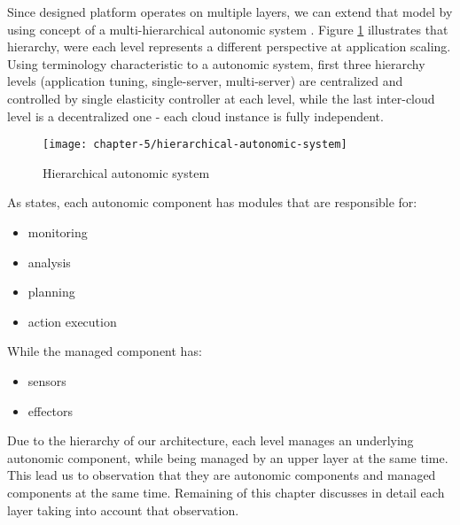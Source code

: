 Since designed platform operates on multiple layers, we can extend that model by using concept of a multi-hierarchical autonomic system \cite{LiWoZh05}. Figure \ref{ch5:hierarchical-autonomic-system} illustrates that hierarchy, were each level represents a different perspective at application scaling. Using terminology characteristic to a autonomic system, first three hierarchy levels (application tuning, single-server, multi-server) are centralized and controlled by single elasticity controller at each level, while the last inter-cloud level is a decentralized one - each cloud instance is fully independent.

\begin{figure}[!ht]
  \begin{center}
    \texttt{[image: chapter-5/hierarchical-autonomic-system]}
  \end{center}
  \caption{Hierarchical autonomic system}
  \label{ch5:hierarchical-autonomic-system}
\end{figure}

As \cite{IBM06} states, each autonomic component has modules that are responsible for:
\begin{itemize}
	\item monitoring
	\item analysis
	\item planning
	\item action execution
\end{itemize}

While the managed component has:
\begin{itemize}
	\item sensors
	\item effectors
\end{itemize}

Due to the hierarchy of our architecture, each level manages an underlying autonomic component, while being managed by an upper layer at the same time. This lead us to observation that they are autonomic components and managed components at the same time. Remaining of this chapter discusses in detail each layer taking into account that observation.


